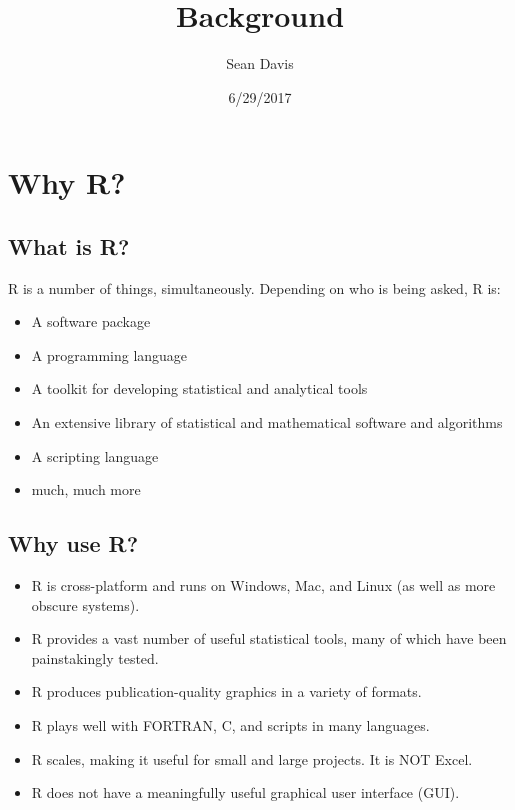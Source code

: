 \documentclass[]{article}
\title{Background}
\author{Sean Davis}
\date{6/29/2017}
\providecommand{\tightlist}{%
  \setlength{\itemsep}{0pt}\setlength{\parskip}{0pt}}
\theoremstyle{definition}
\theoremstyle{definition}
\theoremstyle{remark}
\begin{document}
\maketitle

{
\setcounter{tocdepth}{2}
\tableofcontents
}
\section{Why R?}\label{why-r}

\subsection{What is R?}\label{what-is-r}

R is a number of things, simultaneously. Depending on who is being
asked, R is:

\begin{itemize}
\tightlist
\item
  A software package
\item
  A programming language
\item
  A toolkit for developing statistical and analytical tools
\item
  An extensive library of statistical and mathematical software and
  algorithms
\item
  A scripting language
\item
  much, much more
\end{itemize}

\subsection{Why use R?}\label{why-use-r}

\begin{itemize}
\tightlist
\item
  R is cross-platform and runs on Windows, Mac, and Linux (as well as
  more obscure systems).
\item
  R provides a vast number of useful statistical tools, many of which
  have been painstakingly tested.
\item
  R produces publication-quality graphics in a variety of formats.
\item
  R plays well with FORTRAN, C, and scripts in many languages.
\item
  R scales, making it useful for small and large projects. It is NOT
  Excel.
\item
  R does not have a meaningfully useful graphical user interface (GUI).
\end{itemize}
\end{document}

